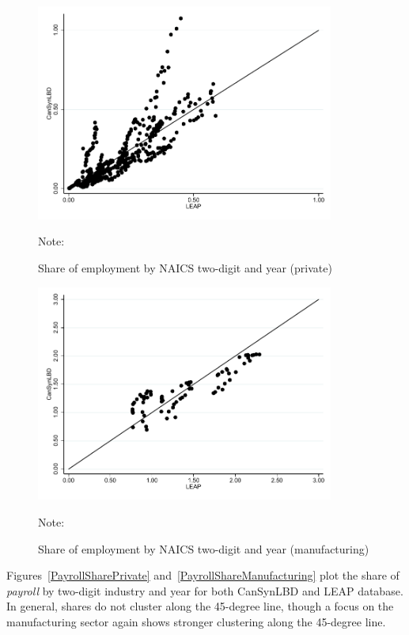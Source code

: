 \begin{figure} [H]
\centering
\caption{Share of employment by NAICS two-digit and year (private)} \label{EmploymentSharePrivate}
\includegraphics[height=2.8in, width=.7\linewidth]{graphs/Share_of_employment_by_NAICS_two-digit_and_year_private_bw.pdf} 
\begin{minipage}{0.85\textwidth}
{\footnotesize Note: \CanTableNote \par}
\end{minipage}
\end{figure}
\vspace{-15.5pt}
\begin{figure} [H]
\centering
\caption{Share of employment by NAICS two-digit and year (manufacturing)} \label{EmploymentShareManufacturing}
\includegraphics[height=2.8in, width=.7\linewidth]{graphs/Share_of_employment_by_NAICS_two-digit_and_year_Manufacturing_bw.pdf} 
\begin{minipage}{0.85\textwidth}
{\footnotesize Note: \CanTableNote \par}
\end{minipage}
\end{figure}

Figures~\ref{PayrollSharePrivate} and~\ref{PayrollShareManufacturing} plot the share of \textit{payroll} by two-digit industry and year for both CanSynLBD and LEAP database. In general, shares do not cluster along the 45-degree line, though a focus on  the manufacturing sector again shows stronger clustering along the 45-degree line.

